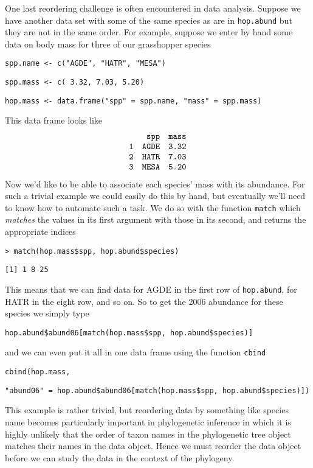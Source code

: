 \documentclass[12pt]{article}
\newcommand{\R}[1] {
	\item \texttt{#1}
}
\newenvironment{verbatim}{ 
	\indent
	\begin{list}{}{\setlength{\itemsep}{-1.5mm}}
}{
	\end{list}
}
\begin{document}
One last reordering challenge is often encountered in data analysis. Suppose we have another data set with some of the same species as are in \verb+hop.abund+ but they are not in the same order.  For example, suppose we enter by hand some data on body mass for three of our grasshopper species
\begin{verbatim}
	\R{spp.name <- c("AGDE", "HATR", "MESA")}
	\R{spp.mass <- c( 3.32, 7.03, 5.20)}
	\R{hop.mass <- data.frame("spp" = spp.name, "mass" = spp.mass)}
\end{verbatim}
This data frame looks like
\begin{equation*}
	\begin{array}{lrr}
				& 	\verb+spp+	&	\verb+mass+	\\
		\verb+1+	&	\verb+AGDE+	&	\verb+3.32+	\\
		\verb+2+	&	\verb+HATR+	&	\verb+7.03+	\\
		\verb+3+	&	\verb+MESA+	&	\verb+5.20+	\\
	\end{array}
\end{equation*}
Now we'd like to be able to associate each species' mass with its abundance.  For such a trivial example we could easily do this by hand, but eventually we'll need to know how to automate such a task.  We do so with the function \verb+match+ which \emph{matches} the values in its first argument with those in its second, and returns the appropriate indices
\begin{verbatim}
	\R{> match(hop.mass\$spp, hop.abund\$species)}
	\R{[1] 1 8 25}
\end{verbatim}
This means that we can find data for AGDE in the first row of \verb+hop.abund+, for HATR in the eight row, and so on.  So to get the 2006 abundance for these species we simply type
\begin{verbatim}
	\R{hop.abund\$abund06[match(hop.mass\$spp, hop.abund\$species)]}
\end{verbatim}
and we can even put it all in one data frame using the function \verb+cbind+
\begin{verbatim}
	\R{cbind(hop.mass,}
	\R{"abund06" = hop.abund\$abund06[match(hop.mass\$spp, hop.abund\$species)])}
\end{verbatim}
This example is rather trivial, but reordering data by something like species name becomes particularly important in phylogenetic inference in which it is highly unlikely that the order of taxon names in the phylogenetic tree object matches their names in the data object.  Hence we must reorder the data object before we can study the data in the context of the phylogeny.
\end{document}
